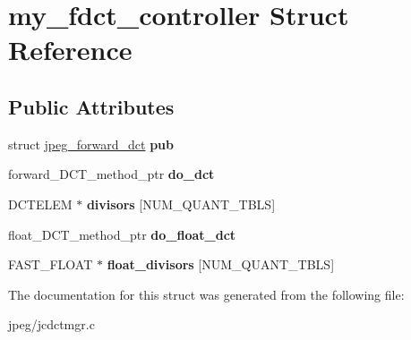 \hypertarget{structmy__fdct__controller}{}\section{my\+\_\+fdct\+\_\+controller Struct Reference}
\label{structmy__fdct__controller}
\subsection*{Public Attributes}
\begin{DoxyCompactItemize}
\item 
struct \hyperlink{structjpeg__forward__dct}{jpeg\+\_\+forward\+\_\+dct} {\bfseries pub}\hypertarget{structmy__fdct__controller_a233a1343c6fc838dcad3d3dce3a658a0}{}\label{structmy__fdct__controller_a233a1343c6fc838dcad3d3dce3a658a0}

\item 
forward\+\_\+\+D\+C\+T\+\_\+method\+\_\+ptr {\bfseries do\+\_\+dct}\hypertarget{structmy__fdct__controller_a345ef16b5c19cd68fddd32dd83745a71}{}\label{structmy__fdct__controller_a345ef16b5c19cd68fddd32dd83745a71}

\item 
D\+C\+T\+E\+L\+EM $\ast$ {\bfseries divisors} \mbox{[}N\+U\+M\+\_\+\+Q\+U\+A\+N\+T\+\_\+\+T\+B\+LS\mbox{]}\hypertarget{structmy__fdct__controller_a3355de21d37044cf0f08f44938868bde}{}\label{structmy__fdct__controller_a3355de21d37044cf0f08f44938868bde}

\item 
float\+\_\+\+D\+C\+T\+\_\+method\+\_\+ptr {\bfseries do\+\_\+float\+\_\+dct}\hypertarget{structmy__fdct__controller_a0c1a43b5f3bca3871742183e00213511}{}\label{structmy__fdct__controller_a0c1a43b5f3bca3871742183e00213511}

\item 
F\+A\+S\+T\+\_\+\+F\+L\+O\+AT $\ast$ {\bfseries float\+\_\+divisors} \mbox{[}N\+U\+M\+\_\+\+Q\+U\+A\+N\+T\+\_\+\+T\+B\+LS\mbox{]}\hypertarget{structmy__fdct__controller_a3de557b163ea4ed33523ef4fc13dc962}{}\label{structmy__fdct__controller_a3de557b163ea4ed33523ef4fc13dc962}

\end{DoxyCompactItemize}


The documentation for this struct was generated from the following file\+:\begin{DoxyCompactItemize}
\item 
jpeg/jcdctmgr.\+c\end{DoxyCompactItemize}
